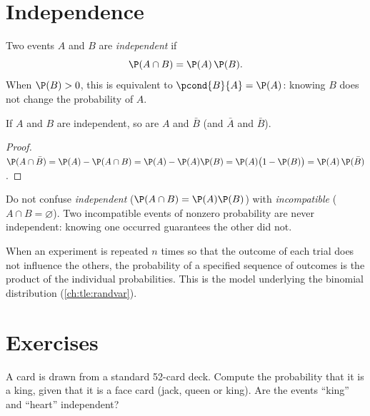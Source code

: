\section{Independence}

\begin{definition}\label{def:tle:condprob:indep}
Two events $A$ and $B$ are \emph{independent} if
\[
\P(A \cap B) = \P(A)\,\P(B) .
\]
When $\P(B) > 0$, this is equivalent to $\pcond{B}{A} = \P(A)$: knowing $B$
does not change the probability of $A$.
\end{definition}

\begin{proposition}\label{prop:tle:condprob:indepcompl}
If $A$ and $B$ are independent, so are $A$ and $\bar B$ (and $\bar A$ and
$\bar B$).
\end{proposition}

\begin{proof}
$\P(A \cap \bar B) = \P(A) - \P(A \cap B) = \P(A) - \P(A)\P(B)
= \P(A)\bigl(1 - \P(B)\bigr) = \P(A)\,\P(\bar B)$.
\end{proof}

\begin{remark}
Do not confuse \emph{independent} ($\P(A\cap B) = \P(A)\P(B)$) with
\emph{incompatible} ($A \cap B = \varnothing$). Two incompatible events of
nonzero probability are never independent: knowing one occurred guarantees
the other did not.
\end{remark}

\begin{definition}\label{def:tle:condprob:repet}
When an experiment is repeated $n$ times so that the outcome of each trial
does not influence the others, the probability of a specified sequence of
outcomes is the product of the individual probabilities. This is the model
underlying the binomial distribution (\cref{ch:tle:randvar}).
\end{definition}

\section{Exercises}

\begin{exercise}[$\star$]\label{exo:tle:condprob:1}
A card is drawn from a standard 52-card deck. Compute the probability that
it is a king, given that it is a face card (jack, queen or king). Are the
events ``king'' and ``heart'' independent?
\end{exercise}

